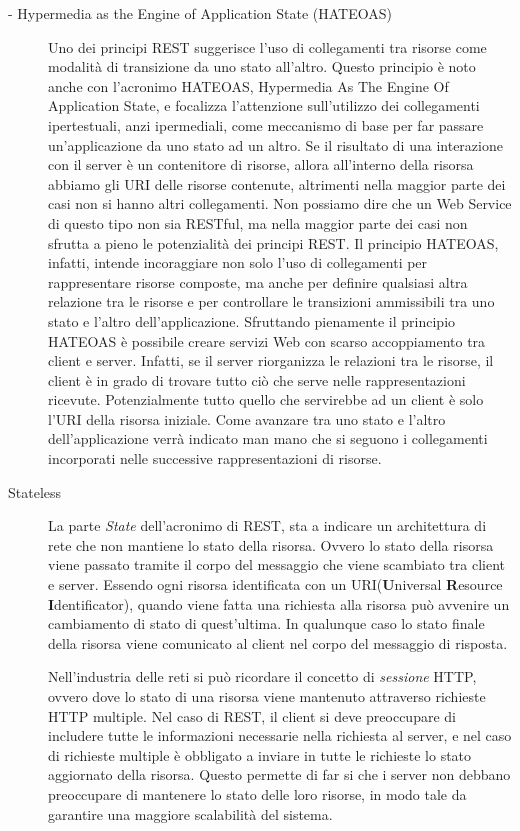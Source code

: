 \begin{description}
\item[- Hypermedia as the Engine of Application State (HATEOAS)] 
\label{itm:hateoas}
Uno dei principi REST suggerisce l'uso di collegamenti tra risorse come modalità di transizione da uno stato all'altro. Questo principio è noto anche con l'acronimo HATEOAS, Hypermedia As The Engine Of Application State, e focalizza l'attenzione sull'utilizzo dei collegamenti ipertestuali, anzi ipermediali, come meccanismo di base per far passare un'applicazione da uno stato ad un altro.
Se il risultato di una interazione con il server è un contenitore di risorse, allora all’interno della risorsa abbiamo gli URI delle risorse contenute, altrimenti nella maggior parte dei casi non si hanno altri collegamenti. Non possiamo dire che un Web Service di questo tipo non sia RESTful, ma nella maggior parte dei casi non sfrutta a pieno le potenzialità dei principi REST.
Il principio HATEOAS, infatti, intende incoraggiare non solo l’uso di collegamenti per rappresentare risorse composte, ma anche per definire qualsiasi altra relazione tra le risorse e per controllare le transizioni ammissibili tra uno stato e l’altro dell’applicazione.
Sfruttando pienamente il principio HATEOAS è possibile creare servizi Web con scarso accoppiamento tra client e server. Infatti, se il server riorganizza le relazioni tra le risorse, il client è in grado di trovare tutto ciò che serve nelle rappresentazioni ricevute. Potenzialmente tutto quello che servirebbe ad un client è solo l’URI della risorsa iniziale. Come avanzare tra uno stato e l’altro dell’applicazione verrà indicato man mano che si seguono i collegamenti incorporati nelle successive rappresentazioni di risorse.
\hspace*{\fill}\cite{web:hateoas}

\item[Stateless]

La parte \emph{State} dell'acronimo di REST, sta a indicare un architettura di rete che non mantiene lo stato della risorsa. Ovvero lo stato della risorsa viene passato tramite il corpo del messaggio che viene scambiato tra client e server. Essendo ogni risorsa identificata con un URI(\textbf{U}niversal \textbf{R}esource \textbf{I}dentificator), quando viene fatta una richiesta alla risorsa può avvenire un cambiamento di stato di quest'ultima. In qualunque caso lo stato finale della risorsa viene comunicato al client nel corpo del messaggio di risposta.

Nell'industria delle reti si può ricordare il concetto di \emph{sessione} HTTP, ovvero dove lo stato di una risorsa viene mantenuto attraverso richieste HTTP multiple. Nel caso di REST, il client si deve preoccupare di includere tutte le informazioni necessarie nella richiesta al server, e nel caso di richieste multiple è obbligato a inviare in tutte le richieste lo stato aggiornato della risorsa. Questo permette di far si che i server non debbano preoccupare di mantenere lo stato delle loro risorse, in modo tale da garantire una maggiore scalabilità del sistema.


\end{description}
